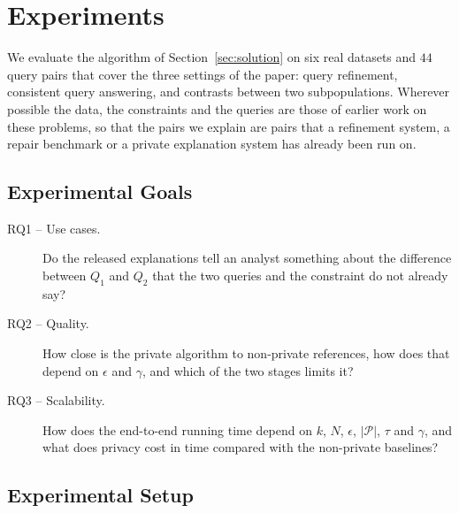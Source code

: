 \section{Experiments}
\label{sec:experiments}

We evaluate the algorithm of Section~\ref{sec:solution} on six real datasets and $44$ query pairs that cover the three settings of the paper: query refinement, consistent query answering, and contrasts between two subpopulations.
Wherever possible the data, the constraints and the queries are those of earlier work on these problems, so that the pairs we explain are pairs that a refinement system, a repair benchmark or a private explanation system has already been run on.


\subsection{Experimental Goals}
\label{subsec:experimental-goals}

\begin{description}
  \item[RQ1 -- Use cases.] Do the released explanations tell an analyst something about the difference between $Q_1$ and $Q_2$ that the two queries and the constraint do not already say?
  \item[RQ2 -- Quality.] How close is the private algorithm to non-private references, how does that depend on $\epsilon$ and $\gamma$, and which of the two stages limits it?
  \item[RQ3 -- Scalability.] How does the end-to-end running time depend on $k$, $N$, $\epsilon$, $|\mathcal{P}|$, $\tau$ and $\gamma$, and what does privacy cost in time compared with the non-private baselines?
\end{description}

\subsection{Experimental Setup}
\label{subsec:experimental-setup}

